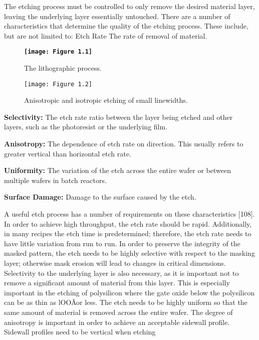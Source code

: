 \tab The etching process must be controlled to only remove the desired material layer, leaving the underlying layer essentially untouched. There are a number of characteristics that determine the quality of the etching process. These include, but are not limited to: Etch Rate The rate of removal of material.

\begin{figure}[H]
	\centering
	\bf\texttt{[image: Figure 1.1]}
	\caption{The lithographic process.}
	\label{fig:1.1}
\end{figure}

\begin{figure}[H]
	\centering
	\texttt{[image: Figure 1.2]}
	\bf\caption{Anisotropic and isotropic etching of small linewidths.}
	\label{fig:1.2}
\end{figure}

\noindent\textbf{Selectivity:} The etch rate ratio between the layer being etched and other \\
\indent layers, such as the photoresist or the underlying film.

\vspace{.25cm}

\noindent\textbf{Anisotropy:} The dependence of etch rate on direction. This usually refers to 
\indent greater
vertical than horizontal etch rate.

\vspace{.25cm}

\noindent\textbf{Uniformity:} The variation of the etch across the entire wafer or between\\ 
\indent multiple wafers in batch reactors.

\vspace{.25cm}

\noindent\textbf{Surface Damage:} Damage to the surface caused by the etch.

\vspace{.25cm}

A useful etch process has a number of requirements on these characteristics [108]. In order to achieve high throughput, the etch rate should be rapid. Additionally, in many recipes the etch time is predetermined; therefore, the etch rate needs to have little variation from run to run. In order to preserve the integrity of the masked pattern, the etch needs to be highly selective with respect to the masking layer; otherwise mask erosion will lead to changes in critical dimensions. Selectivity to the underlying layer is also necessary, as it is important not to remove a significant amount of material from this layer. This is especially important in the etching of polysilicon where the gate oxide below the polysilicon can be as thin as lOOÂor less. The etch needs to be highly uniform so that the same amount of material is removed across the entire wafer. The degree of anisotropy is important in order to achieve an acceptable sidewall profile. Sidewall profiles need to be vertical when etching 

